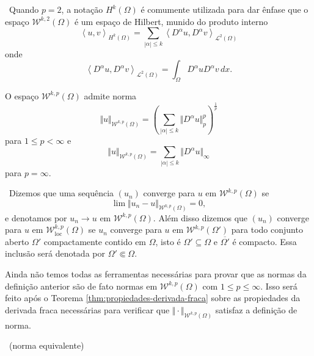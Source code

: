 \documentclass[a4paper, 11pt]{book}
\theoremstyle{definition}
\newcommand{\obs}{\noindent{\textbf{\textcolor{black}{\sffamily Observação:}}}~}
\newcommand{\cL}{\mathcal{L}}
\newcommand{\cW}{\mathcal{W}}
\newcommand{\esssup}{\mathrm{ess\,sup}\,}
\newcommand{\loc}{\mathrm{loc}}
\begin{document}
\obs Quando $p = 2$, a notação $H^{k}(\Omega)$ é comumente utilizada para dar ênfase que o espaço $\cW^{k,2}(\Omega)$ é um espaço de Hilbert, munido do produto interno
\[
    \left\langle u, v\right\rangle _{H^k(\Omega)} = \sum_{|\alpha| \leqslant k} \left\langle D^\alpha u, D^\alpha v\right\rangle _{\cL^2(\Omega)}
\]
onde
\[
    \left\langle D^\alpha u, D^\alpha v\right\rangle _{\cL^2(\Omega)} = \int_\Omega D^\alpha u D^\alpha v \,dx.
\]

\begin{dbox}
    O espaço $\cW^{k,p}(\Omega)$ admite norma
    \[
        \Vert u \Vert_{\cW^{k,p}(\Omega)} = \left( \sum_{|\alpha| \leqslant k} \Vert D^\alpha u \Vert_p^p \right)^{\frac{1}{p}}
    \]
    para $1 \leqslant p < \infty$ e 
    \[
        \Vert u \Vert_{\cW^{k,p}(\Omega)} 
        = \sum_{|\alpha| \leqslant k} \Vert D^{\alpha}u \Vert_\infty
    \]
    para $p = \infty$.
\end{dbox}

\obs Dizemos que uma sequência $(u_n)$ converge para $u$ em $\cW^{k,p}(\Omega)$ se
\[
    \lim \Vert u_n - u \Vert_{\cW^{k,p}(\Omega)} = 0,
\]
e denotamos por $u_n \to u \text{ em } \cW^{k,p}(\Omega)$.
Além disso dizemos que $(u_n)$ converge para $u$ em $\cW^{k,p}_\loc(\Omega)$ se $u_n$ converge para $u$ em $\cW^{k,p}(\Omega')$ para todo conjunto aberto $\Omega'$ compactamente contido em $\Omega$, isto é $\Omega' \subseteq \Omega$ e $\overline{\Omega'}$ é compacto. Essa inclusão será denotada por $\Omega' \Subset \Omega$.

Ainda não temos todas as ferramentas necessárias para provar que as normas da definição anterior são de fato normas em $\cW^{k,p}(\Omega)$ com $1 \leqslant p \leqslant \infty$. Isso será feito após o Teorema \ref{thm:propiedades-derivada-fraca} sobre as propiedades da derivada fraca necessárias para verificar que $\Vert \cdot \Vert_{\cW^{k,p}(\Omega)}$ satisfaz a definição de norma.

\obs (norma equivalente)
\end{document}
